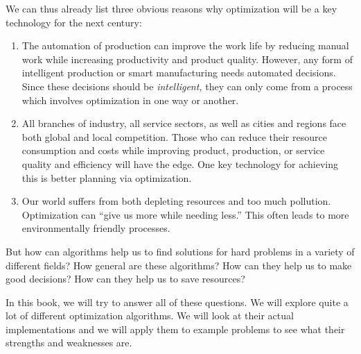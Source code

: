 We can thus already list three obvious reasons why optimization will be a key technology for the next century:%
%
\begin{enumerate}%
%
\item The automation of production can improve the work life by reducing manual work while increasing productivity and product quality.
However, any form of intelligent production or smart manufacturing needs automated decisions.
Since these decisions should be \emph{intelligent,} they can only come from a process which involves optimization in one way or another.%
%
\item All branches of industry, all service sectors, as well as cities and regions face both global and local competition.
Those who can reduce their resource consumption and costs while improving product, production, or service quality and efficiency will have the edge.
One key technology for achieving this is better planning via optimization.%
%
\item Our world suffers from both depleting resources and too much pollution.
Optimization can ``give us more while needing less.''
This often leads to more environmentally friendly processes.%
%
\end{enumerate}%
%
But how can algorithms help us to find solutions for hard problems in a variety of different fields?
How general are these algorithms?
How can they help us to make good decisions?
How can they help us to save resources?

In this book, we will try to answer all of these questions.
We will explore quite a lot of different optimization algorithms.
We will look at their actual implementations and we will apply them to example problems to see what their strengths and weaknesses are.%
%
%
%
%
\endhsection\endhsection%
%
